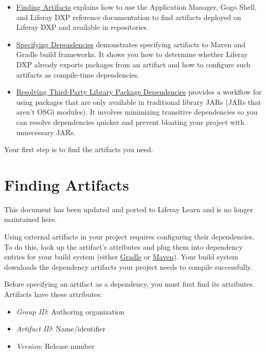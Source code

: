 \begin{itemize}
\item
  \href{/docs/7-2/customization/-/knowledge_base/c/finding-artifacts}{Finding
  Artifacts} explains how to use the Application Manager, Gogo Shell,
  and Liferay DXP reference documentation to find artifacts deployed on
  Liferay DXP and available in repositories.
\item
  \href{/docs/7-2/customization/-/knowledge_base/c/specifying-dependencies}{Specifying
  Dependencies} demonstrates specifying artifacts to Maven and Gradle
  build frameworks. It shows you how to determine whether Liferay DXP
  already exports packages from an artifact and how to configure such
  artifacts as compile-time dependencies.
\item
  \href{/docs/7-2/customization/-/knowledge_base/c/adding-third-party-libraries-to-a-module}{Resolving
  Third-Party Library Package Dependencies} provides a workflow for
  using packages that are only available in traditional library JARs
  (JARs that aren't OSGi modules). It involves minimizing transitive
  dependencies so you can resolve dependencies quicker and prevent
  bloating your project with unnecessary JARs.
\end{itemize}

Your first step is to find the artifacts you need.

\chapter{Finding Artifacts}\label{finding-artifacts}

{ This document has been updated and ported to Liferay Learn and is no
longer maintained here.}

Using external artifacts in your project requires configuring their
dependencies. To do this, look up the artifact's attributes and plug
them into dependency entries for your build system (either
\href{https://gradle.org/}{Gradle} or
\href{https://maven.apache.org/}{Maven}). Your build system downloads
the dependency artifacts your project needs to compile successfully.

Before specifying an artifact as a dependency, you must first find its
attributes. Artifacts have these attributes:

\begin{itemize}
\tightlist
\item
  \emph{Group ID}: Authoring organization
\item
  \emph{Artifact ID}: Name/identifier
\item
  \emph{Version}: Release number
\end{itemize}


